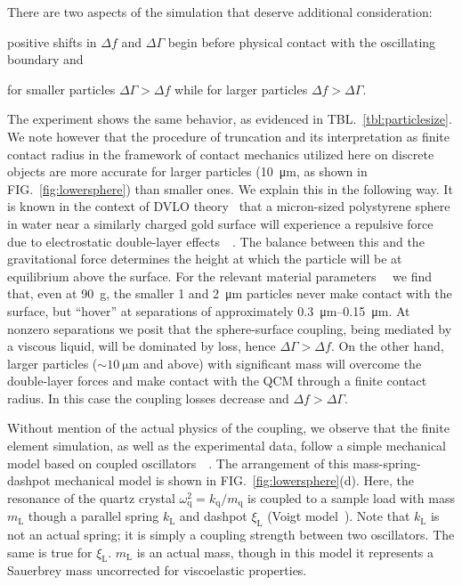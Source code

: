 \documentclass[floatfix,superscriptaddress,a4paper,twocolumn]{revtex4-1}
\newcommand{\Figure}[1]{FIG.~\ref{#1}}
\newcommand{\Table}[1]{TBL.~\ref{#1}}
\newcommand{\df}{\Delta\!f}
\newcommand{\dg}{\Delta\Gamma}
\newcommand{\xil}{\xi_\mathrm{L}}
\newcommand{\kl}{k_\mathrm{L}}
\newcommand{\ml}{m_\mathrm{L}}
\newcommand{\kq}{k_\mathrm{q}}
\newcommand{\mq}{m_\mathrm{q}}
\newcommand{\omegaq}{\omega_\mathrm{q}}
\begin{document}
There are two aspects of the simulation that deserve additional
consideration:
\begin{inparaenum}[(1)]
\item positive shifts in $\df$ and $\dg$ begin
before physical contact with the oscillating boundary and
\item for smaller particles $\dg>\df$ while for
larger particles $\df>\dg$.
\end{inparaenum}
The experiment shows the same behavior, as evidenced in
\Table{tbl:particlesize}.  We note however that the procedure of truncation
and its interpretation as finite contact radius in the framework of contact
mechanics utilized here on discrete objects are more accurate for larger
particles (\SI{10}{\micro\meter}, as shown in \Figure{fig:lowersphere})
than smaller ones.  We explain this in the following way.
It is known in
the context of DVLO theory~\cite{israelachvili2011intermolecular} that a
micron-sized polystyrene sphere in water near a similarly charged gold
surface will experience a repulsive force due to electrostatic double-layer
effects~\cite{alexander1987hydrodynamic}~\cite{flicker1993quantifying}.
The balance between this and the gravitational force determines the height
at which the particle will be at equilibrium above the surface.  For the
relevant material
parameters~\cite{israelachvili2011intermolecular}~\cite{sharma1992factors}
we find that, even at \SI{90}{g}, the smaller \num{1} and
\SI{2}{\micro\meter} particles never make contact with the surface, but
``hover'' at separations of approximately
\SIrange{0.3}{0.15}{\micro\meter}.  At nonzero separations we posit that
the sphere-surface coupling, being mediated by a viscous liquid, will be
dominated by loss, hence $\dg>\df$.  On the other hand, larger particles
($\sim\SI{10}{\micro\meter}$ and above) with significant mass will overcome
the double-layer forces and make contact with the QCM through a finite
contact radius.  In this case the coupling losses decrease and $\df>\dg$.

Without mention of the actual physics of the coupling, we observe that the
finite element simulation, as well as the experimental data, follow a simple
mechanical model based on coupled
oscillators~\cite{dybwad1985sensitive}~\cite{olsson2012probing}.  The
arrangement of this mass-spring-dashpot mechanical model is shown in
\Figure{fig:lowersphere}(d).  Here, the resonance of the quartz crystal
$\omegaq^2=\kq/\mq$ is coupled to a sample load with mass $\ml$ though a
parallel spring $\kl$ and dashpot $\xil$ (Voigt
model~\cite{sips1950mechanical}).  Note that $\kl$ is not an actual spring; it
is simply a coupling strength between two oscillators.  The same is true for
$\xil$.  $\ml$ is an actual mass, though in this model it represents a
Sauerbrey mass uncorrected for viscoelastic properties.
\end{document}
